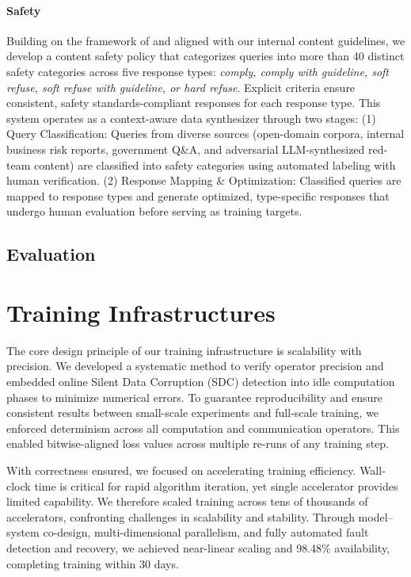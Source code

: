 \documentclass{article}
\begin{document}
\paragraph{Safety}
Building on the framework of \citet{rule_safety_nips} and aligned with our internal content guidelines, we develop a content safety policy that categorizes queries into more than 40 distinct safety categories across five response types: \textit{comply, comply with guideline, soft refuse, soft refuse with guideline, or hard refuse}. Explicit criteria ensure consistent, safety standards-compliant responses for each response type. This system operates as a context-aware data synthesizer through two stages: (1) Query Classification: Queries from diverse sources (open-domain corpora, internal business risk reports, government Q\&A, and adversarial LLM-synthesized red-team content) are classified into safety categories using automated labeling with human verification. (2) Response Mapping \& Optimization: Classified queries are mapped to response types and generate optimized, type-specific responses that undergo human evaluation before serving as training targets.



\subsection{Evaluation}



\section{Training Infrastructures}
The core design principle of our training infrastructure is scalability with precision. We developed a systematic method to verify operator precision and embedded online Silent Data Corruption (SDC) detection into idle computation phases to minimize numerical errors. To guarantee reproducibility and ensure consistent results between small-scale experiments and full-scale training, we enforced determinism across all computation and communication operators. This enabled bitwise-aligned loss values across multiple re-runs of any training step.

With correctness ensured, we focused on accelerating training efficiency. Wall-clock time is critical for rapid algorithm iteration, yet single accelerator provides limited capability. We therefore scaled training across tens of thousands of accelerators, confronting challenges in scalability and stability. Through model–system co-design, multi-dimensional parallelism, and fully automated fault detection and recovery, we achieved near-linear scaling and 98.48\% availability, completing training within 30 days.
\end{document}

